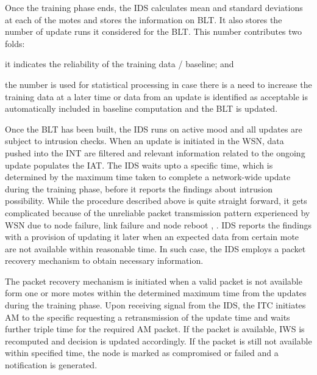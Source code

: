 \documentclass[conference,final]{IEEEtran}
\begin{document}
Once the training phase ends, the IDS calculates mean and standard deviations at each of the motes and stores the  information on BLT.
It also stores the number of update runs it considered for the BLT.
This number contributes two folds:
\begin{inparaenum}
\item it indicates the reliability of the training data / baseline; and
\item the number is used for statistical processing in case there is a need to increase the training data at a later time or data from an update is identified as acceptable is automatically included in baseline computation and the BLT is updated.
\end{inparaenum}
Once the BLT has been built, the IDS runs on active mood and all updates are subject to intrusion checks.
When an update is initiated in the WSN, data pushed into the INT are filtered and relevant information related to the ongoing update populates the  IAT.
The IDS waits upto a specific time, which is determined by the maximum time taken to complete a network-wide  update during the training phase, before it reports the findings about intrusion possibility.
While the procedure described above is quite straight forward, it gets complicated because of the unreliable packet transmission pattern experienced by WSN due to node failure, link failure and node reboot \cite{aro04}, \cite{bec04}.
IDS reports the findings with a provision of updating it later when an expected data from certain mote are not available within reasonable time.
In such case, the IDS employs a packet recovery mechanism to obtain necessary information.

The packet recovery mechanism is initiated when a valid packet is not available form one or more motes within  the  determined maximum time from the updates  during the training phase.
Upon receiving signal from the IDS, the ITC initiates AM to the specific requesting a retransmission of the update time and waits further  triple time for the required AM packet. If the packet is available,  IWS is recomputed and decision is updated accordingly.
If the packet is still not available within specified time, the node is marked as compromised or failed and a notification is generated.





\end{document}
